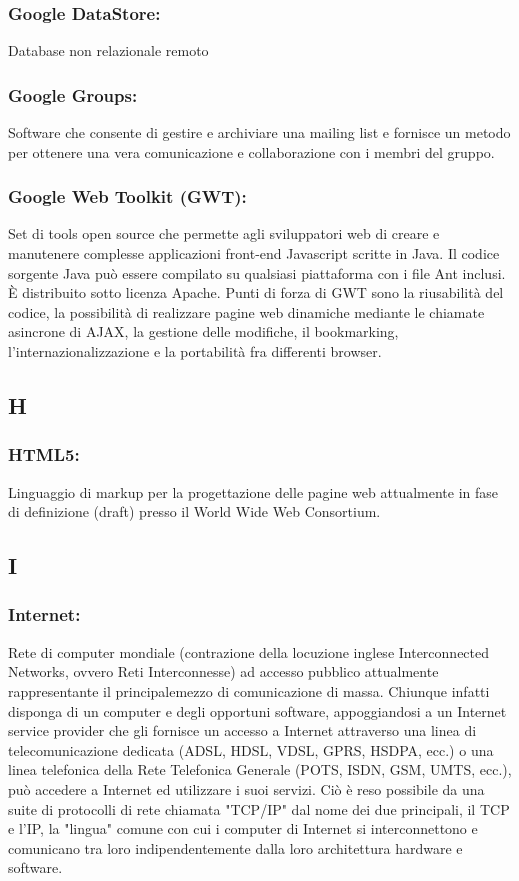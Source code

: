 \subsubsection*{Google DataStore:} Database non relazionale remoto

\subsubsection*{Google Groups:} Software che consente di gestire e archiviare
una mailing list e fornisce un metodo per ottenere una vera comunicazione e
collaborazione con i membri del gruppo.

\subsubsection*{Google Web Toolkit (GWT):} Set di tools open source che
permette agli sviluppatori web di creare e manutenere complesse applicazioni front-end
Javascript scritte in Java. Il codice sorgente Java pu\`o essere compilato su
qualsiasi piattaforma con i file Ant inclusi. \`E distribuito sotto licenza
Apache. Punti di forza di GWT sono la riusabilit\`a del codice, la possibilit\`a di
realizzare pagine web dinamiche mediante le chiamate asincrone di AJAX, la
gestione delle modifiche, il bookmarking, l'internazionalizzazione e la
portabilit\`a fra differenti browser.

\subsection*{\huge{H}}
\subsubsection*{HTML5:} Linguaggio di markup per la progettazione delle pagine
web attualmente in fase di definizione (draft) presso il World Wide Web Consortium.

\subsection*{\huge{I}}
\subsubsection*{Internet:}  Rete di computer mondiale (contrazione della
locuzione inglese Interconnected Networks, ovvero Reti Interconnesse) ad accesso pubblico
attualmente rappresentante il principalemezzo di comunicazione di massa.
Chiunque infatti disponga di un computer e degli opportuni software,
appoggiandosi a un Internet service provider che gli fornisce un accesso a
Internet attraverso una linea di telecomunicazione dedicata (ADSL, HDSL, VDSL,
GPRS, HSDPA, ecc.) o una linea telefonica della Rete Telefonica Generale (POTS,
ISDN, GSM, UMTS, ecc.), pu\`o accedere a Internet ed utilizzare i suoi servizi.
Ci\`o \`e reso possibile da una suite di protocolli di rete chiamata "TCP/IP" dal
nome dei due principali, il TCP e l'IP, la "lingua" comune con cui i computer di
Internet si interconnettono e comunicano tra loro indipendentemente dalla loro
architettura hardware e software.

